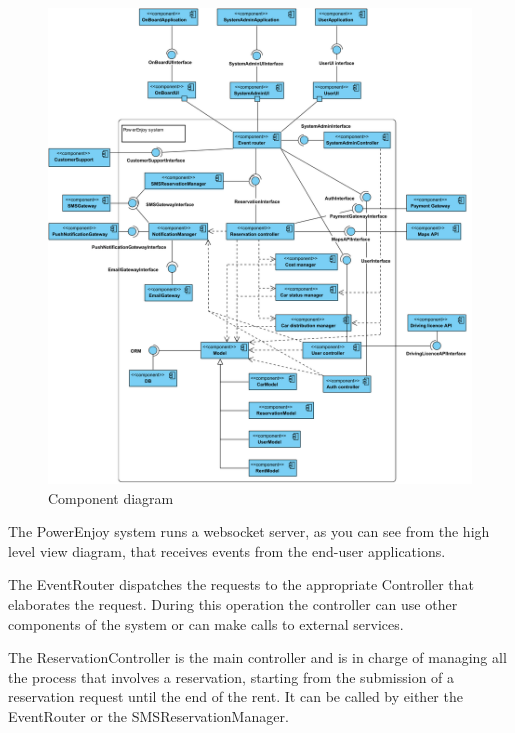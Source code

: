 \begin{figure}[H]
\includegraphics[width=\textwidth, keepaspectratio]{../images/architectural_design/component_diagram.png}
\caption{Component diagram}
\end{figure}
The PowerEnjoy system runs a websocket server, as you can see from the high level view diagram, that receives events from the end-user applications.

The EventRouter dispatches the requests to the appropriate Controller that elaborates the request.
During this operation the controller can use other components of the system or can make calls to external services.

The ReservationController is the main controller and is in charge of managing all the process that involves a reservation, starting from the submission of a reservation request until the end of the rent.
It can be called by either the EventRouter or the SMSReservationManager.

